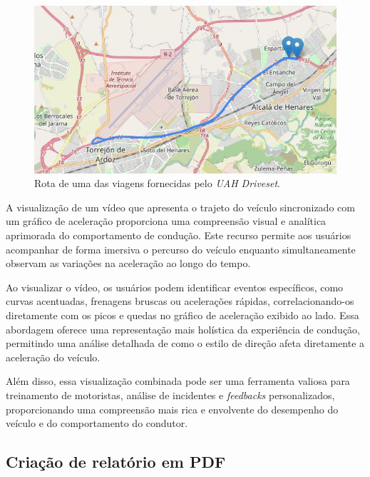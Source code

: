     \begin{figure}[hp]
        \centering
        
        \includegraphics[scale=0.8]{figures/rota_1.jpg}
        
        \caption{Rota de uma das viagens fornecidas pelo \textit{UAH Driveset}.}
        
        \label{fig:car_route_1}
    \end{figure}
    
    A visualização de um vídeo que apresenta o trajeto do veículo sincronizado com um gráfico de aceleração proporciona uma compreensão visual e analítica aprimorada do comportamento de condução. Este recurso permite aos usuários acompanhar de forma imersiva o percurso do veículo enquanto simultaneamente observam as variações na aceleração ao longo do tempo. 
    
    Ao visualizar o vídeo, os usuários podem identificar eventos específicos, como curvas acentuadas, frenagens bruscas ou acelerações rápidas, correlacionando-os diretamente com os picos e quedas no gráfico de aceleração exibido ao lado. Essa abordagem oferece uma representação mais holística da experiência de condução, permitindo uma análise detalhada de como o estilo de direção afeta diretamente a aceleração do veículo. 
    
    Além disso, essa visualização combinada pode ser uma ferramenta valiosa para treinamento de motoristas, análise de incidentes e \textit{feedbacks} personalizados, proporcionando uma compreensão mais rica e envolvente do desempenho do veículo e do comportamento do condutor.


    \subsection{Criação de relatório em PDF}
    
